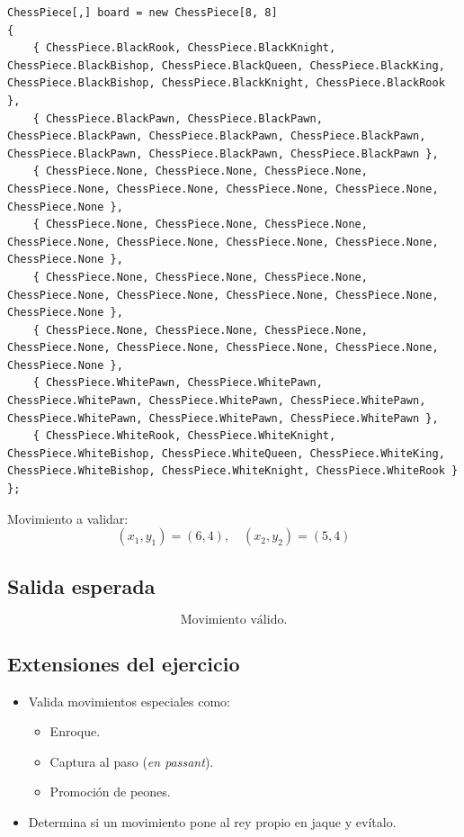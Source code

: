 \begin{lstlisting}[caption=Tablero inicial]
ChessPiece[,] board = new ChessPiece[8, 8]
{
    { ChessPiece.BlackRook, ChessPiece.BlackKnight, ChessPiece.BlackBishop, ChessPiece.BlackQueen, ChessPiece.BlackKing, ChessPiece.BlackBishop, ChessPiece.BlackKnight, ChessPiece.BlackRook },
    { ChessPiece.BlackPawn, ChessPiece.BlackPawn, ChessPiece.BlackPawn, ChessPiece.BlackPawn, ChessPiece.BlackPawn, ChessPiece.BlackPawn, ChessPiece.BlackPawn, ChessPiece.BlackPawn },
    { ChessPiece.None, ChessPiece.None, ChessPiece.None, ChessPiece.None, ChessPiece.None, ChessPiece.None, ChessPiece.None, ChessPiece.None },
    { ChessPiece.None, ChessPiece.None, ChessPiece.None, ChessPiece.None, ChessPiece.None, ChessPiece.None, ChessPiece.None, ChessPiece.None },
    { ChessPiece.None, ChessPiece.None, ChessPiece.None, ChessPiece.None, ChessPiece.None, ChessPiece.None, ChessPiece.None, ChessPiece.None },
    { ChessPiece.None, ChessPiece.None, ChessPiece.None, ChessPiece.None, ChessPiece.None, ChessPiece.None, ChessPiece.None, ChessPiece.None },
    { ChessPiece.WhitePawn, ChessPiece.WhitePawn, ChessPiece.WhitePawn, ChessPiece.WhitePawn, ChessPiece.WhitePawn, ChessPiece.WhitePawn, ChessPiece.WhitePawn, ChessPiece.WhitePawn },
    { ChessPiece.WhiteRook, ChessPiece.WhiteKnight, ChessPiece.WhiteBishop, ChessPiece.WhiteQueen, ChessPiece.WhiteKing, ChessPiece.WhiteBishop, ChessPiece.WhiteKnight, ChessPiece.WhiteRook }
};
\end{lstlisting}

Movimiento a validar:
\[
(x_1, y_1) = (6, 4), \quad (x_2, y_2) = (5, 4)
\]

\subsection*{Salida esperada}

\[
\text{Movimiento válido.}
\]

\subsection*{Extensiones del ejercicio}
\begin{itemize}
    \item Valida movimientos especiales como:
    \begin{itemize}
        \item Enroque.
        \item Captura al paso (\textit{en passant}).
        \item Promoción de peones.
    \end{itemize}
    \item Determina si un movimiento pone al rey propio en jaque y evítalo.
\end{itemize}
